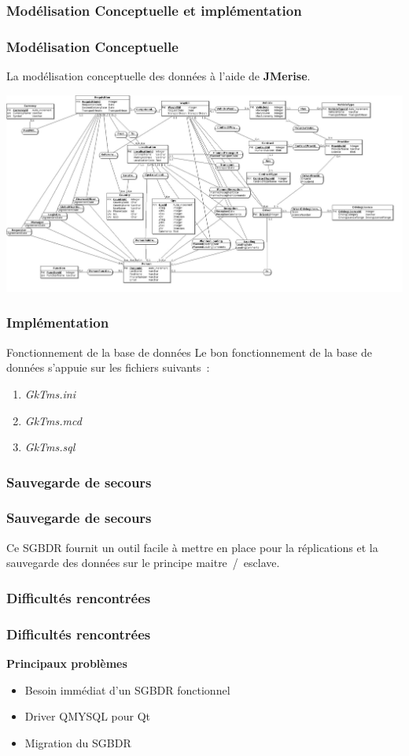 \subsubsection[Modélisation Conceptuelle et implémentation]{Modélisation Conceptuelle et implémentation}
\begin{frame}
\frametitle{Modélisation Conceptuelle}
La modélisation conceptuelle des données à l'aide de \textbf{JMerise}.\\
\begin{center}
\includegraphics[scale=0.15]{Images/Database}
\end{center}
\end{frame}

\begin{frame}
\frametitle{Implémentation}

\begin{block}{Fonctionnement de la base de données}
Le bon fonctionnement de la base de données s'appuie sur les fichiers suivants~:
\begin{enumerate}
	\item \emph{GkTms.ini}
	\item \emph{GkTms.mcd}
	\item \emph{GkTms.sql}
\end{enumerate}
\end{block}
\end{frame}

\subsubsection[Sauvegarde de secours]{Sauvegarde de secours}
\begin{frame}
\frametitle{Sauvegarde de secours}
\begin{block}{}
Ce SGBDR fournit un outil facile à mettre en place pour la réplications et la sauvegarde des données sur le principe maitre~/~esclave.
\end{block}
\end{frame}

\subsubsection{Difficultés rencontrées}
\begin{frame}
\frametitle{Difficultés rencontrées}
\begin{block}{\textbf{Principaux problèmes}}
\begin{itemize}
\item Besoin immédiat d'un SGBDR fonctionnel
\item Driver QMYSQL pour Qt
\item Migration du SGBDR
\end{itemize}
\end{block}
\end{frame}
